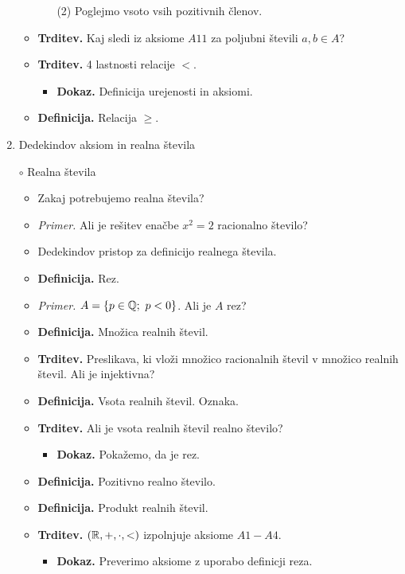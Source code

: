 \begin{enumerate}
\begin{itemize}
\begin{itemize}
            (2) Poglejmo vsoto vsih pozitivnih členov.
        \end{itemize}
        \item \colorbox{blue!30}{\textbf{Trditev.}} Kaj sledi iz aksiome $A11$ za poljubni števili $a, b \in A$?      
        \item \colorbox{blue!30}{\textbf{Trditev.}} 4 lastnosti relacije $<$.
        \begin{itemize}
            \item \colorbox{green!30}{\textbf{Dokaz.}} Definicija urejenosti in aksiomi.
        \end{itemize}
        \item \colorbox{purple!30}{\textbf{Definicija.}} Relacija $\geq$.        
    \end{itemize}

    \newpage
    \item Dedekindov aksiom in realna števila
    \item[$\circ$] Realna števila
    \begin{itemize}
        \item Zakaj potrebujemo realna števila?
        \item \colorbox{yellow!30}{\emph{Primer.}} Ali je rešitev enačbe $x^2 = 2$ racionalno število?
        \item Dedekindov pristop za definicijo realnega števila. 
        \item \colorbox{purple!30}{\textbf{Definicija.}} Rez.
        \item \colorbox{yellow!30}{\emph{Primer.}} $A = \left\{p \in \mathbb{Q}; \ p<0\right\}$. Ali je $A$ rez?
        \item \colorbox{purple!30}{\textbf{Definicija.}} Množica realnih števil.
        \item \colorbox{blue!30}{\textbf{Trditev.}} Preslikava, ki vloži množico racionalnih števil v množico realnih števil. Ali je injektivna?
        \item \colorbox{purple!30}{\textbf{Definicija.}} Vsota realnih števil. Oznaka.
        \item \colorbox{blue!30}{\textbf{Trditev.}} Ali je vsota realnih števil realno število?
        \begin{itemize}
            \item \colorbox{green!30}{\textbf{Dokaz.}} Pokažemo, da je rez.
        \end{itemize}
        \item \colorbox{purple!30}{\textbf{Definicija.}} Pozitivno realno število. 
        \item \colorbox{purple!30}{\textbf{Definicija.}} Produkt realnih števil.
        \item \colorbox{blue!30}{\textbf{Trditev.}} $(\mathbb{R}, +, \cdot, <)$ izpolnjuje aksiome $A1-A4$.        
        \begin{itemize}
            \item \colorbox{green!30}{\textbf{Dokaz.}} Preverimo aksiome z uporabo definicji reza. 
            

\end{itemize}
\end{itemize}
\end{enumerate}
